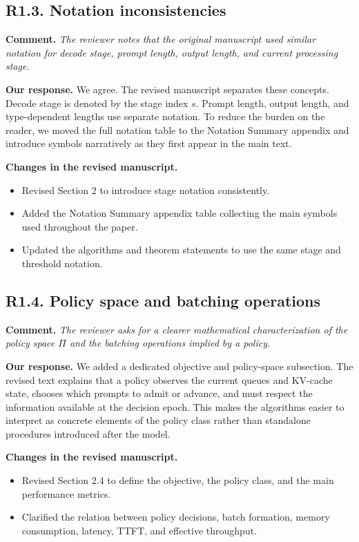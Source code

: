 \documentclass[11pt]{article}
\newcommand{\comment}[1]{%
  \vspace{0.25em}
  \noindent\textbf{Comment.} \emph{#1}
}
\newcommand{\response}{\vspace{0.25em}\noindent\textbf{Our response.} }
\newcommand{\changes}{\vspace{0.25em}\noindent\textbf{Changes in the revised manuscript.} }
\begin{document}
\subsection*{R1.3. Notation inconsistencies}

\comment{The reviewer notes that the original manuscript used similar notation for decode stage, prompt length, output length, and current processing stage.}

\response We agree. The revised manuscript separates these concepts. Decode stage is denoted by the stage index \(s\). Prompt length, output length, and type-dependent lengths use separate notation. To reduce the burden on the reader, we moved the full notation table to the Notation Summary appendix and introduce symbols narratively as they first appear in the main text.

\changes
\begin{itemize}
    \item Revised Section 2 to introduce stage notation consistently.
    \item Added the Notation Summary appendix table collecting the main symbols used throughout the paper.
    \item Updated the algorithms and theorem statements to use the same stage and threshold notation.
\end{itemize}

\subsection*{R1.4. Policy space and batching operations}

\comment{The reviewer asks for a clearer mathematical characterization of the policy space \(\Pi\) and the batching operations implied by a policy.}

\response We added a dedicated objective and policy-space subsection. The revised text explains that a policy observes the current queues and KV-cache state, chooses which prompts to admit or advance, and must respect the information available at the decision epoch. This makes the algorithms easier to interpret as concrete elements of the policy class rather than standalone procedures introduced after the model.

\changes
\begin{itemize}
    \item Revised Section 2.4 to define the objective, the policy class, and the main performance metrics.
    \item Clarified the relation between policy decisions, batch formation, memory consumption, latency, TTFT, and effective throughput.
\end{itemize}
\end{document}
